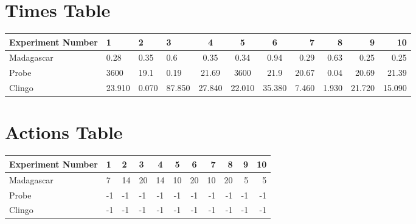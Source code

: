 \documentclass[8pt]{article}
\begin{document}
\begin{landscape}
\section{Times Table}\begin{tabular}{ | l | l | l | l | c | c | c | r | r | r | r | }\hline
Experiment Number & 1 & 2 & 3 & 4 & 5 & 6 & 7 & 8 & 9 & 10\\  \hline
Madagascar & 0.28 & 0.35 & 0.6 & 0.35 & 0.34 & 0.94 & 0.29 & 0.63 & 0.25 & 0.25\\  \hline
Probe & 3600 & 19.1 & 0.19 & 21.69 & 3600 & 21.9 & 20.67 & 0.04 & 20.69 & 21.39\\  \hline
Clingo & 23.910 & 0.070 & 87.850 & 27.840 & 22.010 & 35.380 & 7.460 & 1.930 & 21.720 & 15.090\\ \hline
\end{tabular}
\section{Actions Table}\begin{tabular}{ | l | l | l | l | c | c | c | r | r | r | r | }\hline
Experiment Number & 1 & 2 & 3 & 4 & 5 & 6 & 7 & 8 & 9 & 10\\ \hline
 Madagascar & 7 & 14 & 20 & 14 & 10 & 20 & 10 & 20 & 5 & 5\\ \hline
 Probe & -1 & -1 & -1 & -1 & -1 & -1 & -1 & -1 & -1 & -1\\ \hline
 Clingo & -1 & -1 & -1 & -1 & -1 & -1 & -1 & -1 & -1 & -1\\ \hline
\end{tabular}
\end{landscape}
\end{document}
